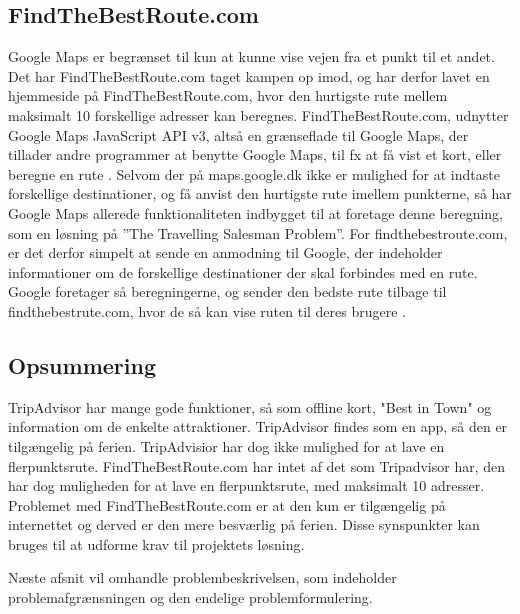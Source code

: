 \subsection{FindTheBestRoute.com}
Google Maps er begrænset til kun at kunne vise vejen fra et punkt til et andet. Det har FindTheBestRoute.com taget kampen op imod, og har derfor lavet en hjemmeside på FindTheBestRoute.com, hvor den hurtigste rute mellem maksimalt 10 forskellige adresser kan beregnes. FindTheBestRoute.com, udnytter Google Maps JavaScript API v3, altså en grænseflade til Google Maps, der tillader andre programmer at benytte Google Maps, til fx at få vist et kort, eller beregne en rute \citep{ftbr}.\newline
Selvom der på maps.google.dk ikke er mulighed for at indtaste forskellige destinationer, og få anvist den hurtigste rute imellem punkterne, så har Google Maps allerede funktionaliteten indbygget til at foretage denne beregning, som en løsning på ”The Travelling Salesman Problem”.\newline
For findthebestroute.com, er det derfor simpelt at sende en anmodning til Google, der indeholder informationer om de forskellige destinationer der skal forbindes med en rute. Google foretager så beregningerne, og sender den bedste rute tilbage til findthebestrute.com, hvor de så kan vise ruten til deres brugere \citep{googleapi}. \newline
\subsection{Opsummering}
TripAdvisor har mange gode funktioner, så som offline kort, "Best in Town" og information om de enkelte attraktioner. TripAdvisor findes som en app, så den er tilgængelig på ferien. TripAdvisior har dog ikke mulighed for at lave en flerpunktsrute. \newline
FindTheBestRoute.com har intet af det som Tripadvisor har, den har dog muligheden for at lave en flerpunktsrute, med maksimalt 10 adresser. Problemet med FindTheBestRoute.com er at den kun er tilgængelig på internettet og derved er den mere besværlig på ferien.\newline
Disse synspunkter kan bruges til at udforme krav til projektets løsning. \newline

Næste afsnit vil omhandle problembeskrivelsen, som indeholder problemafgrænsningen og den endelige problemformulering. 
